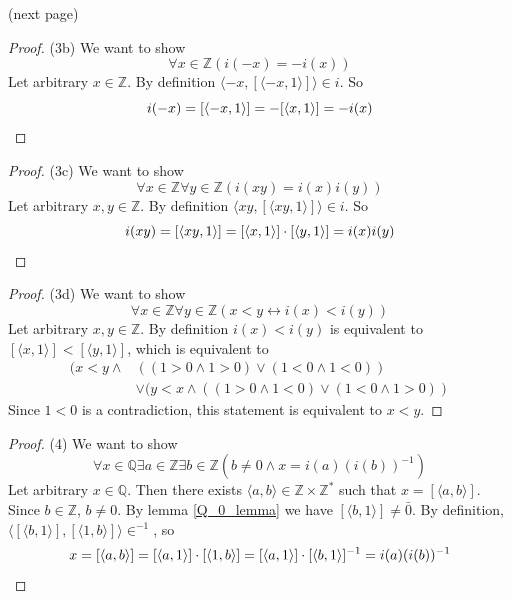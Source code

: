 \documentclass{report}
\begin{document}
\noindent(next page)\newpage
\begin{proof}(3b)
We want to show
\begin{equation*}
\forall x\in\mathbb Z(i(-x)=-i(x))
\end{equation*}
Let arbitrary $x\in\mathbb Z$. By definition $\langle-x,[\langle-x,1\rangle]\rangle\in i$. So
\begin{equation*}
i(-x)=[\langle-x,1\rangle]=-[\langle x,1\rangle]=-i(x)\qedhere
\end{equation*}
\end{proof}
\begin{proof}(3c)
We want to show
\begin{equation*}
\forall x\in\mathbb Z\forall y\in\mathbb Z(i(xy)=i(x)i(y))
\end{equation*}
Let arbitrary $x,y\in\mathbb Z$. By definition $\langle xy,[\langle xy,1\rangle]\rangle\in i$. So
\begin{equation*}
i(xy)=[\langle xy,1\rangle]=[\langle x,1\rangle]\cdot[\langle y,1\rangle]=i(x)i(y)\qedhere
\end{equation*}
\end{proof}
\begin{proof}(3d)
We want to show
\begin{equation*}
\forall x\in\mathbb Z\forall y\in\mathbb Z(x<y\leftrightarrow i(x)<i(y))
\end{equation*}
Let arbitrary $x,y\in\mathbb Z$. By definition $i(x)<i(y)$ is equivalent to $[\langle x,1\rangle]<[\langle y,1\rangle]$, which is equivalent to 
\begin{align*}
(x<y\land&((1>0\land 1>0)\lor(1<0\land1<0))\\
&\lor(y<x\land((1>0\land 1<0)\lor(1<0\land1>0))
\end{align*}
Since $1<0$ is a contradiction, this statement is equivalent to $x<y$.
\end{proof}
\begin{proof}(4)
We want to show
\begin{equation*}
\forall x\in\mathbb Q\exists a\in\mathbb Z\exists b\in\mathbb Z(b\neq0\land x=i(a)(i(b))^{-1})
\end{equation*}
Let arbitrary $x\in\mathbb Q$. Then there exists $\langle a,b\rangle\in\mathbb Z\times\mathbb Z^*$ such that 
$x=[\langle a,b\rangle]$.
Since $b\in\mathbb Z$, $b\neq0$. By lemma \ref{Q_0_lemma} we have $[\langle b,1\rangle]\neq\bar0$. By definition, 
$\langle[\langle b,1\rangle],[\langle 1,b\rangle]\rangle\in^{-1}$, so
\begin{equation*}
x=[\langle a,b\rangle]=[\langle a,1\rangle]\cdot[\langle 1,b\rangle]=[\langle a,1\rangle]\cdot[\langle b,1\rangle]^{-1}=i(a)(i(b))^{-1}\qedhere
\end{equation*}
\end{proof}
\newpage
\end{document}

